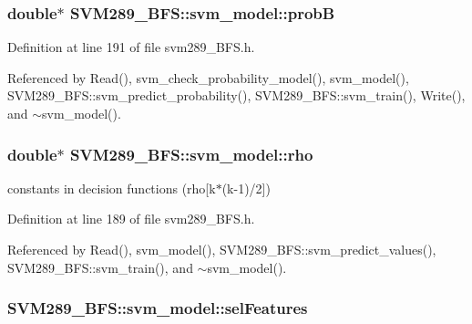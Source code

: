 \subsubsection[{\texorpdfstring{probB}{probB}}]{\setlength{\rightskip}{0pt plus 5cm}double$\ast$ S\+V\+M289\+\_\+\+B\+F\+S\+::svm\+\_\+model\+::probB}\hypertarget{struct_s_v_m289___b_f_s_1_1svm__model_a0cb0367a81209a239cb14d71505a1c9f}{}\label{struct_s_v_m289___b_f_s_1_1svm__model_a0cb0367a81209a239cb14d71505a1c9f}


Definition at line 191 of file svm289\+\_\+\+B\+F\+S.\+h.



Referenced by Read(), svm\+\_\+check\+\_\+probability\+\_\+model(), svm\+\_\+model(), S\+V\+M289\+\_\+\+B\+F\+S\+::svm\+\_\+predict\+\_\+probability(), S\+V\+M289\+\_\+\+B\+F\+S\+::svm\+\_\+train(), Write(), and $\sim$svm\+\_\+model().

\subsubsection[{\texorpdfstring{rho}{rho}}]{\setlength{\rightskip}{0pt plus 5cm}double$\ast$ S\+V\+M289\+\_\+\+B\+F\+S\+::svm\+\_\+model\+::rho}\hypertarget{struct_s_v_m289___b_f_s_1_1svm__model_a53ee57b614f764a30ef4dc67d2a2167f}{}\label{struct_s_v_m289___b_f_s_1_1svm__model_a53ee57b614f764a30ef4dc67d2a2167f}
constants in decision functions (rho\mbox{[}k$\ast$(k-\/1)/2\mbox{]}) 

Definition at line 189 of file svm289\+\_\+\+B\+F\+S.\+h.



Referenced by Read(), svm\+\_\+model(), S\+V\+M289\+\_\+\+B\+F\+S\+::svm\+\_\+predict\+\_\+values(), S\+V\+M289\+\_\+\+B\+F\+S\+::svm\+\_\+train(), and $\sim$svm\+\_\+model().

\subsubsection[{\texorpdfstring{sel\+Features}{selFeatures}}]{ S\+V\+M289\+\_\+\+B\+F\+S\+::svm\+\_\+model\+::sel\+Features}\hypertarget{struct_s_v_m289___b_f_s_1_1svm__model_aceafce36596b75a5ca5c085897286c8a}{}\label{struct_s_v_m289___b_f_s_1_1svm__model_aceafce36596b75a5ca5c085897286c8a}


